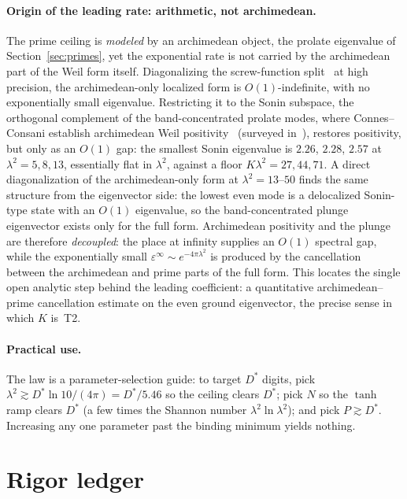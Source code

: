 \documentclass[11pt,a4paper]{article}
\begin{document}
\paragraph{Origin of the leading rate: arithmetic, not archimedean.}
The prime ceiling is \emph{modeled} by an archimedean object, the prolate
eigenvalue of Section~\ref{sec:primes}, yet the exponential rate is not carried
by the archimedean part of the Weil form itself. Diagonalizing the
screw-function split~\cite{Suzuki2026} at high precision, the archimedean-only
localized form is $O(1)$-indefinite, with no exponentially small eigenvalue.
Restricting it to the Sonin subspace, the orthogonal complement of the
band-concentrated prolate modes, where Connes--Consani establish archimedean Weil
positivity~\cite{ConnesConsaniSelecta} (surveyed in~\cite{Connes2026}),
restores positivity, but only as an $O(1)$ gap:
the smallest Sonin eigenvalue is $2.26$, $2.28$, $2.57$ at $\lambda^2=5,8,13$,
essentially flat in $\lambda^2$, against a floor $K\lambda^2=27,44,71$. A
direct diagonalization of the archimedean-only form at $\lambda^2=13$--$50$
finds the same structure from the eigenvector side: the lowest even mode is a
delocalized Sonin-type state with an $O(1)$ eigenvalue, so the
band-concentrated plunge eigenvector exists only for the full form.
Archimedean positivity and the plunge are therefore \emph{decoupled}: the place
at infinity supplies an $O(1)$ spectral gap, while the exponentially small
$\varepsilon^\infty\sim e^{-4\pi\lambda^2}$ is produced by the cancellation
between the archimedean and prime parts of the full form. This locates the single
open analytic step behind the leading coefficient: a quantitative
archimedean--prime cancellation estimate on the even ground eigenvector, the
precise sense in which $K$ is~T2.

\paragraph{Practical use.}
The law is a parameter-selection guide: to target $D^\ast$ digits, pick
$\lambda^2\gtrsim D^\ast\ln10/(4\pi)=D^\ast/5.46$ so the ceiling clears
$D^\ast$; pick $N$ so the $\tanh$ ramp clears $D^\ast$ (a few times the Shannon
number $\lambda^2\ln\lambda^2$); and pick $P\gtrsim D^\ast$. Increasing any one
parameter past the binding minimum yields nothing.

\section{Rigor ledger}\label{sec:rigor}
\end{document}
